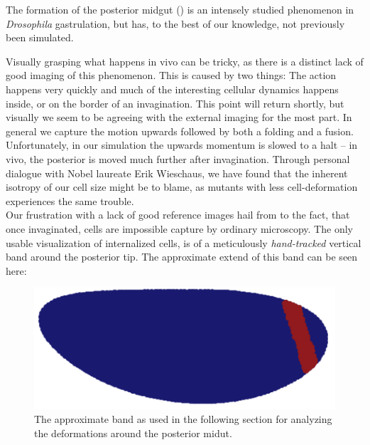 The formation of the posterior midgut () is an intensely studied phenomenon in \textit{Drosophila} gastrulation, but has, to the best of our knowledge, not previously been simulated.

Visually grasping what happens in vivo can be tricky, as there is a distinct lack of good imaging of this phenomenon. This is caused by two things: The action happens very quickly and much of the interesting cellular dynamics happens inside, or on the border of an invagination. This point will return shortly, but visually we seem to be agreeing with the external imaging for the most part. In general we capture the motion upwards followed by both a folding and a fusion. Unfortunately, in our simulation the upwards momentum is slowed to a halt -- in vivo, the posterior is moved much further after invagination. Through personal dialogue with Nobel laureate Erik Wieschaus, we have found that the inherent isotropy of our cell size might be to blame, as mutants with less cell-deformation experiences the same trouble.\\

Our frustration with a lack of good reference images hail from to the fact, that once invaginated, cells are impossible capture by ordinary microscopy. The only usable visualization of internalized cells, is of a meticulously \textit{hand-tracked} vertical band around the posterior tip. The approximate extend of this band can be seen here:
\begin{figure}[H]
    \centering
    \includegraphics[width=0.5\linewidth]{chapters//Results//figures/daniel_band_pos.png}
    \caption{The approximate band as used in the following section for analyzing the deformations around the posterior midut.}
\end{figure}

